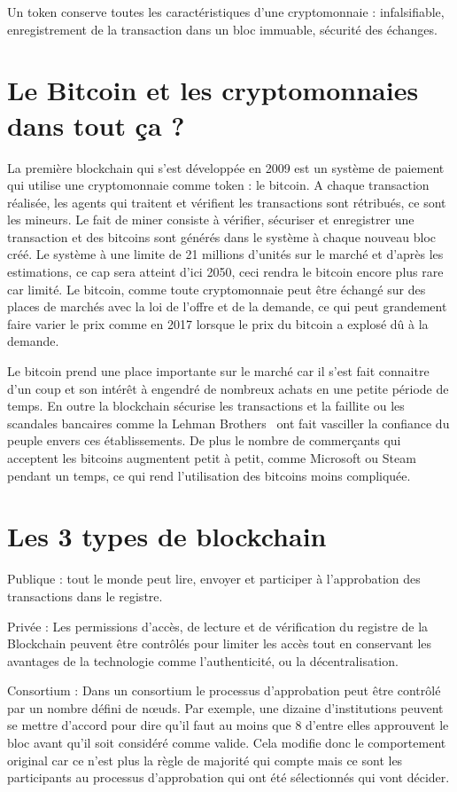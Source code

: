 \documentclass[12pt, a4paper, oneside]{book}
\begin{document}
Un token conserve toutes les caractéristiques d’une cryptomonnaie : infalsifiable, enregistrement de la transaction dans un bloc immuable, sécurité des échanges.

\section{Le Bitcoin et les cryptomonnaies dans tout ça ?}
La première blockchain qui s’est développée en 2009 est un système de paiement qui utilise une cryptomonnaie comme token : le bitcoin. 
A chaque transaction réalisée, les agents qui traitent et vérifient les transactions sont rétribués, ce sont les mineurs. Le fait de miner consiste à vérifier, sécuriser et enregistrer une transaction et des bitcoins sont générés dans le système à chaque nouveau bloc créé.
 Le système à une limite de 21 millions d’unités sur le marché et d’après les estimations, ce cap sera atteint d’ici 2050, ceci rendra le bitcoin encore plus rare car limité. Le bitcoin, comme toute cryptomonnaie peut être échangé sur des places de marchés avec la loi de l’offre et de la demande, ce qui peut grandement faire varier le prix comme en 2017 lorsque le prix du bitcoin a explosé dû à la demande.

Le bitcoin prend une place importante sur le marché car il s'est fait connaitre d'un coup et son intérêt à engendré de nombreux achats en une petite période de temps. En outre la blockchain sécurise les transactions et la faillite ou les scandales bancaires comme la Lehman Brothers~\cite{Lehman} ont fait vasciller la confiance du peuple envers ces établissements.
De plus le nombre de commerçants qui acceptent les bitcoins augmentent petit à petit, comme Microsoft ou Steam pendant un temps, ce qui rend l'utilisation des bitcoins moins compliquée.

\section{Les 3 types de blockchain}

Publique : tout le monde peut lire, envoyer et participer à l'approbation des transactions dans le registre.

Privée : Les permissions d'accès, de lecture et de vérification du registre de la Blockchain peuvent être contrôlés pour limiter les accès tout en conservant les avantages de la technologie comme l'authenticité, ou la décentralisation.

Consortium : Dans un consortium le processus d'approbation peut être contrôlé par un nombre défini de nœuds. Par exemple, une dizaine d'institutions peuvent se mettre d'accord pour dire qu'il faut au moins que 8 d'entre elles approuvent le bloc avant qu'il soit considéré comme valide. Cela modifie donc le comportement original car ce n'est plus la règle de majorité qui compte mais ce sont les participants au processus d'approbation qui ont été sélectionnés qui vont décider.
\end{document}
